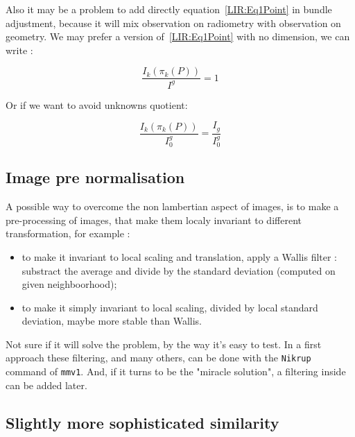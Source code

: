 Also it may be a problem to add directly equation~\ref{LIR:Eq1Point} in bundle
adjustment, because it will mix observation on radiometry with observation on
geometry.  We may prefer a version of~\ref{LIR:Eq1Point} with no dimension,
we can write :

\begin{equation}
    \frac{I_k(\pi_k(P))}{I^g} = 1
\end{equation}

Or if we want to avoid unknowns quotient:

\begin{equation}
    \frac{I_k(\pi_k(P))}{I^g_0} = \frac{I_g}{I^g_0} 
\end{equation}


\subsection{Image pre normalisation}

A possible way to  overcome the non lambertian aspect of images,
is to make a pre-processing of images, that make them localy invariant
to different transformation, for example :

\begin{itemize}
    \item to make it invariant to local scaling and translation, apply a Wallis filter : substract the average and divide by the
          standard deviation (computed on given neighboorhood);

    \item   to make it simply invariant to local scaling,  divided by local standard deviation, maybe more stable than
            Wallis.
\end{itemize}

Not sure if it will solve the problem, by the way it's easy to test.  
In a first approach these filtering, and many others, can be done with
the {\tt Nikrup}  command of {\tt mmv1}. And, if it turns to be the  "miracle solution",
a  filtering inside \PPP can be added later.  





\subsection{Slightly more sophisticated similarity}

